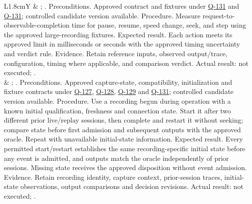 \begin{tabularx}{\linewidth}{L{1.8cm}Y}
 & ; . Preconditions. Approved contract and fixtures under \hyperref[Question:Q-131]{Q-131} and \hyperref[Question:Q-131]{Q-131}; controlled candidate version available. Procedure. Measure request-to-observable-completion time for pause, resume, speed change, seek, and step using the approved large-recording fixtures. Expected result. Each action meets its approved limit in milliseconds or seconds with the approved timing uncertainty and verdict rule. Evidence. Retain reference inputs, observed output/trace, configuration, timing where applicable, and comparison verdict. Actual result: not executed; \StatusPending.\\
 & ; . Preconditions. Approved capture-state, compatibility, initialization and fixture contracts under \hyperref[Question:Q-127]{Q-127}, \hyperref[Question:Q-128]{Q-128}, \hyperref[Question:Q-129]{Q-129} and \hyperref[Question:Q-131]{Q-131}; controlled candidate version available. Procedure. Use a recording begun during operation with a known initial qualification, freshness and connection state. Start it after two different prior live/replay sessions, then complete and restart it without seeking; compare state before first admission and subsequent outputs with the approved oracle. Repeat with unavailable initial-state information. Expected result. Every permitted start/restart establishes the same recording-specific initial state before any event is admitted, and outputs match the oracle independently of prior sessions. Missing state receives the approved disposition without event admission. Evidence. Retain recording identity, capture context, prior-session traces, initial-state observations, output comparisons and decision revisions. Actual result: not executed; \StatusPending.\\
\end{tabularx}
\normalsize
